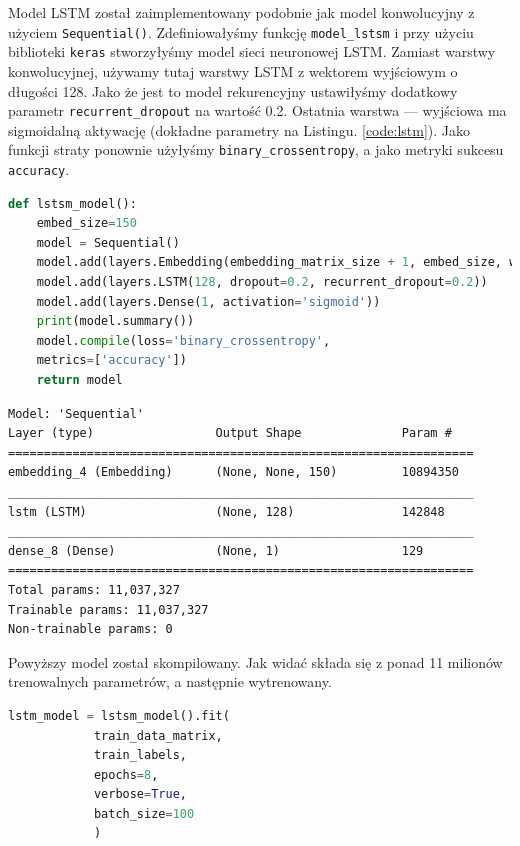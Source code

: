 Model LSTM został zaimplementowany podobnie jak model konwolucyjny z użyciem \verb|Sequential()|. Zdefiniowałyśmy funkcję \verb|model_lstsm| i przy użyciu biblioteki \verb|keras| stworzyłyśmy model sieci neuronowej LSTM. Zamiast warstwy konwolucyjnej, używamy tutaj warstwy LSTM z wektorem wyjściowym o długości 128. Jako że jest to model rekurencyjny ustawiłyśmy dodatkowy parametr \verb|recurrent_dropout| na wartość 0.2. Ostatnia warstwa --- wyjściowa ma sigmoidalną aktywację (dokładne parametry na Listingu. \ref{code:lstm}). Jako funkcji straty ponownie użyłyśmy \verb|binary_crossentropy|, a jako metryki sukcesu \verb|accuracy|.

\begin{lstlisting}[language=Python,frame=single, breaklines=true, caption=Model LSTM.,label=code:lstm]
def lstsm_model():
	embed_size=150
	model = Sequential()
	model.add(layers.Embedding(embedding_matrix_size + 1, embed_size, weights=[embedding_matrix]))
	model.add(layers.LSTM(128, dropout=0.2, recurrent_dropout=0.2))
	model.add(layers.Dense(1, activation='sigmoid'))
	print(model.summary())
	model.compile(loss='binary_crossentropy',
	metrics=['accuracy'])
	return model
\end{lstlisting}

\newpage
\begin{Verbatim}
Model: 'Sequential'
Layer (type)                 Output Shape              Param #   
=================================================================
embedding_4 (Embedding)      (None, None, 150)         10894350  
_________________________________________________________________
lstm (LSTM)                  (None, 128)               142848    
_________________________________________________________________
dense_8 (Dense)              (None, 1)                 129       
=================================================================
Total params: 11,037,327
Trainable params: 11,037,327
Non-trainable params: 0
\end{Verbatim}


\noindent Powyższy model został skompilowany. Jak widać składa się z ponad 11 milionów trenowalnych parametrów, a następnie wytrenowany. 

\begin{lstlisting}[language=Python,frame=single, breaklines=true, caption=Trening modelu LSTM.,label=code:lstm-trening]
lstm_model = lstsm_model().fit(
			train_data_matrix,
			train_labels,
			epochs=8,
			verbose=True,
			batch_size=100
			)
\end{lstlisting}

